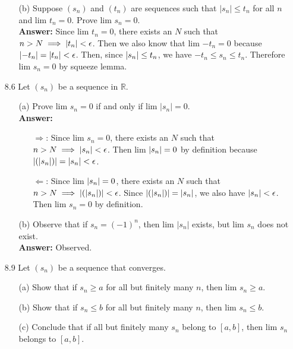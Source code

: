 \documentclass{article}
\begin{document}
\begin{itemize}
\begin{itemize}
              \item [(b)] Suppose $(s_n)$ and $(t_n)$ are sequences such that $|s_n|\leq t_n$ for all $n$ and lim $t_n=0$. Prove lim $s_n=0$.\\
                    \textbf{Answer: } Since lim $t_n=0$, there exists an $N$ such that $n>N\implies \abs{t_n}<\epsilon$. Then we also know that lim $-t_n=0$ because $\abs{-t_n}=\abs{t_n}<\epsilon$. Then, since $\abs{s_n}\leq t_n$, we have $-t_n\leq s_n\leq t_n$. Therefore lim $s_n=0$ by squeeze lemma.
          \end{itemize}
    \item [8.6] Let $(s_n)$ be a sequence in $\mathbb{R}$.
          \begin{itemize}
              \item [(a)] Prove lim $s_n=0$ if and only if lim $|s_n|=0$.\\
                    \textbf{Answer: }
                    \begin{itemize}
                        \item [$\Rightarrow$:] Since lim $s_n=0$, there exists an $N$ such that $n>N\implies\abs{s_n}<\epsilon$. Then lim $\abs{s_n}=0$ by definition because $\abs{(\abs{s_n})}=\abs{s_n}<\epsilon$.
                        \item [$\Leftarrow$:] Since lim $\abs{s_n}=0$, there exists an $N$ such that $n>N\implies\abs{(\abs{s_n})}<\epsilon$. Since $\abs{(\abs{s_n})}=\abs{s_n}$, we also have $\abs{s_n}<\epsilon$. Then lim $s_n=0$ by definition.
                    \end{itemize}
              \item [(b)] Observe that if $s_n=(-1)^n$, then lim $|s_n|$ exists, but lim $s_n$ does not exist.\\
              \textbf{Answer: } Observed.
          \end{itemize}
    \item [8.9] Let $(s_n)$ be a sequence that converges.
          \begin{itemize}
              \item [(a)] Show that if $s_n\geq a$ for all but finitely many $n$, then lim $s_n\geq a$.
              \item [(b)] Show that if $s_n\leq b$ for all but finitely many $n$, then lim $s_n\leq b$.
              \item [(c)] Conclude that if all but finitely many $s_n$ belong to $[a,b]$, then lim $s_n$ belongs to $[a,b]$.
          \end{itemize}

\end{itemize}
\end{document}
